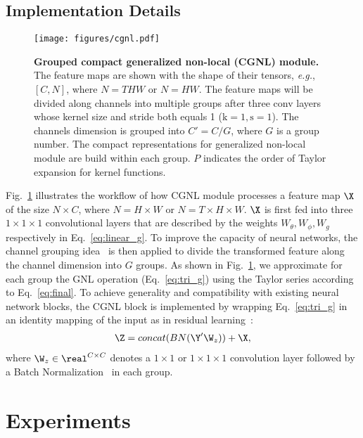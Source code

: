\documentclass{article}
\begin{document}
\subsection{Implementation Details}
%
%
\begin{figure}[H]
  \centering
  \texttt{[image: figures/cgnl.pdf]}
  \caption{\small{
    \textbf{Grouped compact generalized non-local (CGNL) module.}
    The feature maps are shown with the shape of their tensors, \textit{e.g.}, $[C,N]$, where $N = THW$ or $N=HW$.
    The feature maps will be divided along channels into multiple groups after three conv layers whose kernel size and stride both equals 1 ($\text{k}=1, \text{s}=1$).
    The channels dimension is grouped into $C'=C/G$, where $G$ is a group number.
    The compact representations for generalized non-local module are build within each group.
    $P$ indicates the order of Taylor expansion for kernel functions.
  }}
  \label{fig:cgnl}
\end{figure}
%
%
Fig.~\ref{fig:cgnl} illustrates the workflow of how CGNL module processes a feature map $\X$ of the size $N \times C$, where $N = H \times W$ or $N = T \times H \times W$.
$\X$ is first fed into three $1 \times 1 \times 1$ convolutional layers that are described by the weights $W_\theta, W_\phi, W_g$ respectively in Eq.~\ref{eq:linear_g}.
To improve the capacity of neural networks, the channel grouping idea~\cite{resnext,gn} is then applied to divide the transformed feature along the channel dimension into $G$ groups.
As shown in Fig.~\ref{fig:cgnl}, we approximate for each group the GNL operation (Eq.~\ref{eq:tri_g}) using the Taylor series according to Eq.~\ref{eq:final}.
To achieve generality and compatibility with existing neural network blocks, the CGNL block is implemented by wrapping Eq.~\ref{eq:tri_g} in an identity mapping of the input as in residual learning~\cite{resnet}:
\begin{align}
\label{eq:cgnl residual output}
  \Z = concat(BN(\Y' \W_z)) + \X,
\end{align}
where $\W_z \in \real^{C \times C}$ denotes a $1 \times 1$ or $1 \times 1 \times 1$ convolution layer followed by a Batch Normalization~\cite{bn} in each group.
%
%
\section{Experiments}
\label{sec:experiments}
%
%
\end{document}
